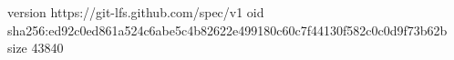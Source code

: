 version https://git-lfs.github.com/spec/v1
oid sha256:ed92c0ed861a524c6abe5c4b82622e499180c60c7f44130f582c0c0d9f73b62b
size 43840
